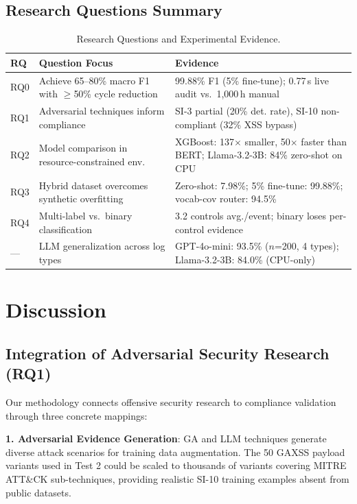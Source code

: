 \documentclass[futureinternet,article,submit,pdftex,moreauthors]{Definitions/mdpi}
\begin{document}
\subsection{Research Questions Summary}

\begin{table}[H]
\caption{Research Questions and Experimental Evidence.\label{tab:rq_summary}}
\begin{tabularx}{\textwidth}{lXX}
\toprule
\textbf{RQ} & \textbf{Question Focus} & \textbf{Evidence} \\
\midrule
RQ0 & Achieve 65--80\% macro F1 with $\geq$50\% cycle reduction & 99.88\% F1 (5\% fine-tune);
0.77\,s live audit vs.\ 1{,}000\,h manual \\
RQ1 & Adversarial techniques inform compliance & SI-3 partial (20\% det. rate), SI-10
non-compliant (32\% XSS bypass) \\
RQ2 & Model comparison in resource-constrained env. & XGBoost: 137$\times$ smaller, 50$\times$
faster than BERT; Llama-3.2-3B: 84\% zero-shot on CPU \\
RQ3 & Hybrid dataset overcomes synthetic overfitting & Zero-shot: 7.98\%; 5\% fine-tune:
99.88\%; vocab-cov router: 94.5\% \\
RQ4 & Multi-label vs.\ binary classification & 3.2 controls avg./event; binary loses
per-control evidence \\
--- & LLM generalization across log types & GPT-4o-mini: 93.5\% ($n$=200, 4 types);
Llama-3.2-3B: 84.0\% (CPU-only) \\
\bottomrule
\end{tabularx}
\end{table}

\section{Discussion}
\label{sec:discussion}

\subsection{Integration of Adversarial Security Research (RQ1)}

Our methodology connects offensive security research to compliance validation through three
concrete mappings:

\textbf{1. Adversarial Evidence Generation}: GA and LLM techniques generate diverse attack
scenarios for training data augmentation. The 50 GAXSS payload variants used in Test 2 could
be scaled to thousands of variants covering MITRE ATT\&CK sub-techniques, providing realistic
SI-10 training examples absent from public datasets.
\end{document}
